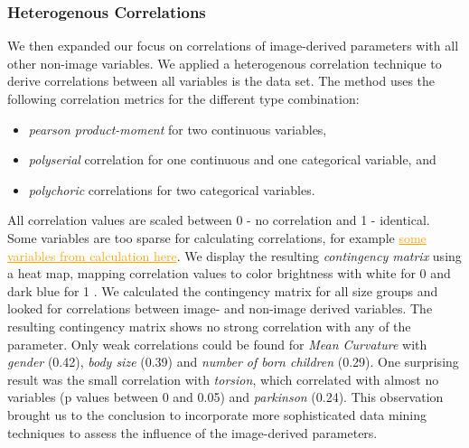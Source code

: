 \documentclass[a4paper,twoside]{style/article}
\newcommand{\com}[1]{\textcolor{orange}{\uline{#1}}}
\begin{document}
\subsubsection{Heterogenous Correlations}
We then expanded our focus on correlations of image-derived parameters with all other non-image variables.
We applied a heterogenous correlation technique to derive correlations between all variables is the data set.
The method uses the following correlation metrics for the different type combination:
\begin{itemize}
\item \emph{pearson product-moment} for two continuous variables, 
\item \emph{polyserial} correlation for one continuous and one categorical variable, and
\item \emph{polychoric} correlations for two categorical variables.
\end{itemize}
All correlation values are scaled between 0 - no correlation and 1 - identical.
Some variables are too sparse for calculating correlations, for example \com{some variables from calculation here}.
We display the resulting \emph{contingency matrix} using a heat map, mapping correlation values to color brightness with white for 0 and dark blue for 1 \cite{Klemm2014VIS}.
We calculated the contingency matrix for all size groups and looked for correlations between image- and non-image derived variables.
The resulting contingency matrix shows no strong correlation with any of the parameter.
Only weak correlations could be found for \emph{Mean Curvature} with \emph{gender} (0.42), \emph{body size} (0.39) and \emph{number of born children} (0.29).
One surprising result was the small correlation with \emph{torsion}, which correlated with almost no variables (p values between 0 and 0.05) and \emph{parkinson} (0.24).
This observation brought us to the conclusion to incorporate more sophisticated data mining techniques to assess the influence of the image-derived parameters.
\end{document}
